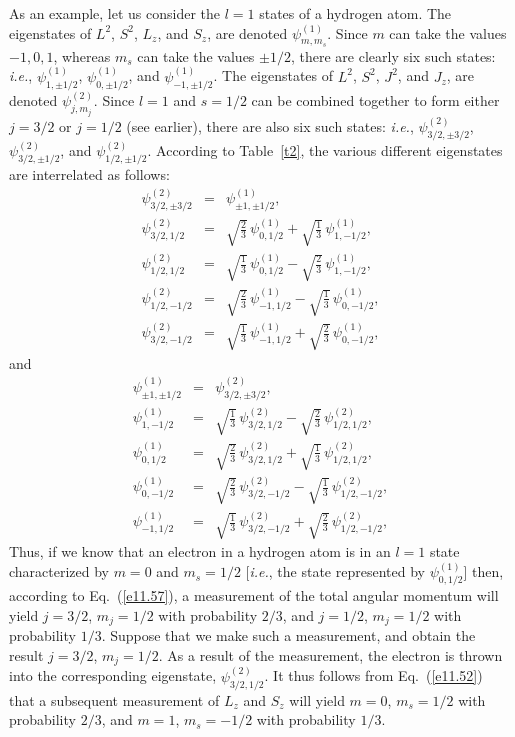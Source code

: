 As an example, let us consider the $l=1$ states of a hydrogen atom. 
The eigenstates of $L^2$, $S^2$, $L_z$, and $S_z$,
 are denoted $\psi^{(1)}_{m,m_s}$. Since $m$ can take the values $-1,0,1$,
 whereas $m_s$ can take the values $\pm 1/2$, there are
 clearly six such states: {\em i.e.}, $\psi^{(1)}_{1,\pm 1/2}$, $\psi^{(1)}_{0,\pm 1/2}$,
 and $\psi^{(1)}_{-1,\pm 1/2}$. The eigenstates of $L^2$, $S^2$, $J^2$, and $J_z$,
 are denoted $\psi^{(2)}_{j,m_j}$. Since $l=1$ and $s=1/2$ can be combined
 together to form either $j=3/2$ or $j=1/2$ (see earlier), there are
 also six such states: {\em i.e.}, $\psi^{(2)}_{3/2,\pm 3/2}$, $\psi^{(2)}_{3/2,\pm 1/2}$, and $\psi^{(2)}_{1/2,\pm 1/2}$. According to
 Table~\ref{t2}, the various different eigenstates are interrelated as follows:
 \begin{eqnarray}\label{ecgs}
 \psi^{(2)}_{3/2,\pm 3/2} &=& \psi^{(1)}_{\pm 1, \pm 1/2},\\[0.5ex]
 \psi^{(2)}_{3/2,1/2} &=& \sqrt{\frac{2}{3}}\,\psi^{(1)}_{0,1/2} + 
\sqrt{ \frac{1}{3}}\,\psi^{(1)}_{1,-1/2},\label{e11.52}\\[0.5ex]
\psi^{(2)}_{1/2,1/2} &=& \sqrt{\frac{1}{3}}\,\psi^{(1)}_{0,1/2} -
\sqrt{ \frac{2}{3}}\,\psi^{(1)}_{1,-1/2},\\[0.5ex]
\psi^{(2)}_{1/2,-1/2} &=& \sqrt{\frac{2}{3}}\,\psi^{(1)}_{-1,1/2} 
-\sqrt{ \frac{1}{3}}\,\psi^{(1)}_{0,-1/2},\\[0.5ex]
\psi^{(2)}_{3/2,-1/2} &=& \sqrt{\frac{1}{3}}\,\psi^{(1)}_{-1,1/2} + 
\sqrt{ \frac{2}{3}}\,\psi^{(1)}_{0,-1/2},
 \end{eqnarray}
 and
 \begin{eqnarray}
 \psi^{(1)}_{\pm 1,\pm 1/2} &=& \psi^{(2)}_{3/2, \pm 3/2},\\[0.5ex]
\psi^{(1)}_{1,-1/2} &=& \sqrt{\frac{1}{3}}\,\psi^{(2)}_{3/2,1/2} -
\sqrt{ \frac{2}{3}}\,\psi^{(2)}_{1/2,1/2},\\[0.5ex]
 \psi^{(1)}_{0,1/2} &=& \sqrt{\frac{2}{3}}\,\psi^{(2)}_{3/2,1/2} + 
\sqrt{ \frac{1}{3}}\,\psi^{(2)}_{1/2,1/2},\label{e11.57}\\[0.5ex]
\psi^{(1)}_{0,-1/2} &=& \sqrt{\frac{2}{3}}\,\psi^{(2)}_{3/2,-1/2} 
-\sqrt{ \frac{1}{3}}\,\psi^{(2)}_{1/2,-1/2},\label{ecge}\\[0.5ex]
\psi^{(1)}_{-1,1/2} &=& \sqrt{\frac{1}{3}}\,\psi^{(2)}_{3/2,-1/2} + 
\sqrt{ \frac{2}{3}}\,\psi^{(2)}_{1/2,-1/2},
 \end{eqnarray}
Thus, if we know that an electron in a hydrogen atom is in an $l=1$ 
state characterized by $m=0$ and $m_s=1/2$ [{\em i.e.}, the state
represented by $\psi^{(1)}_{0,1/2}$] then, according to Eq.~(\ref{e11.57}),
a measurement of the total angular momentum will yield $j=3/2$, $m_j=1/2$
with probability $2/3$, and $j=1/2$, $m_j=1/2$ with probability $1/3$. 
Suppose that we make such a measurement, and obtain the result $j=3/2$, $m_j=1/2$. As a result of the measurement, the electron is thrown into
the corresponding eigenstate, $\psi^{(2)}_{3/2,1/2}$.  It thus follows
from Eq.~(\ref{e11.52}) that a subsequent measurement of $L_z$ and $S_z$
will yield $m=0$, $m_s=1/2$ with probability $2/3$, and $m=1$, $m_s=-1/2$
with probability $1/3$.

